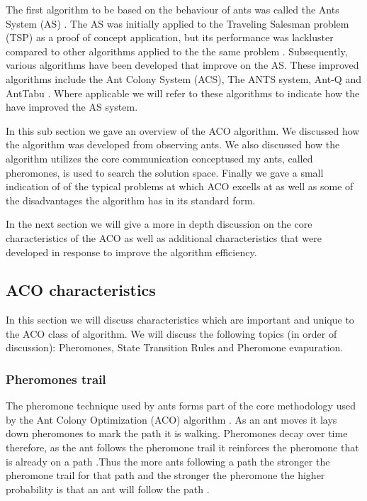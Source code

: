 The first algorithm to be based on the behaviour of ants was called the Ants System (AS) \cite{CompuIntelligenceIntro,AntIntroTrends}. The AS was initially applied to the Traveling Salesman problem (TSP) as a proof of concept application, but its performance was lackluster compared to other algorithms applied to the the same problem \cite{CompuIntelligenceIntro,AntIntroTrends}. Subsequently, various algorithms have been developed that improve on the AS. These improved algorithms include the Ant Colony System (ACS), The ANTS system, Ant-Q and AntTabu \cite{CompuIntelligenceIntro,AntIntroTrends}. Where applicable we will refer to these algorithms to indicate how the have improved the AS system.

In this sub section we gave an overview of the ACO algorithm. We discussed how the algorithm was developed from observing ants. We also discussed how the algorithm utilizes the core communication conceptused my ants, called pheromones, is used to search the solution space. Finally we gave a small indication of of the typical problems at which ACO excells at as well as some of the disadvantages the algorithm has in its standard form.

In the next section we will give a more in depth discussion on the core characteristics of the ACO as well as additional characteristics that were developed in response to improve the algorithm efficiency.
\subsection{ACO characteristics}
\label{sec:ACOcharacter}
In this section we will discuss characteristics which are important and unique to the ACO class of algorithm. We will discuss the following topics (in order of discussion): Pheromones, State Transition Rules and Pheromone evapuration.
\subsubsection{Pheromones trail}
\label{sec:pheromonetrail}
The pheromone technique used by ants forms part of the core methodology used by the Ant Colony Optimization (ACO) algorithm \cite{AntQAP}. As an ant moves it lays down pheromones to mark the path it is walking. Pheromones decay over time therefore, as the ant follows the pheromone trail it reinforces the pheromone that is already on a path \cite{AntQAP}.Thus the more ants following a path the stronger the pheromone trail for that path and the stronger the pheromone the higher probability is that an ant will follow the path \cite{AntQAP}. 

